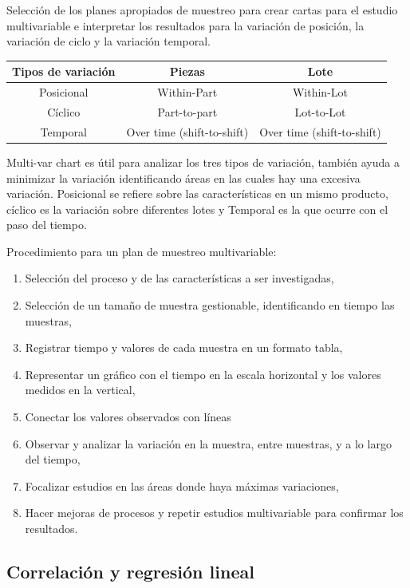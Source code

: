 \documentclass[]{article}
\begin{document}
Selección de los planes apropiados de muestreo para crear cartas para el estudio multivariable e interpretar los resultados para la variación de posición, la variación de ciclo y la variación temporal.

\begin{tabular}{|c|c|c|}
	\hline Tipos de variación & Piezas & Lote \\ 
	\hline Posicional & Within-Part & Within-Lot \\ 
	\hline Cíclico & Part-to-part & Lot-to-Lot \\ 
	\hline Temporal & Over time (shift-to-shift) & Over time (shift-to-shift) \\ 
	\hline 
\end{tabular} 

Multi-var chart es útil para analizar los tres tipos de variación, también ayuda a minimizar la variación identificando áreas en las cuales hay una excesiva variación.
Posicional se refiere sobre las características en un mismo producto, cíclico es la variación sobre diferentes lotes y Temporal es la que ocurre con el paso del tiempo.


Procedimiento para un plan de muestreo multivariable:

\begin{enumerate}
	\item Selección del proceso y de las características a ser investigadas,
	\item Selección de un tamaño de muestra gestionable, identificando en tiempo las muestras,
	\item Registrar tiempo y valores de cada muestra en un formato tabla,
	\item Representar un gráfico con el tiempo en la escala horizontal y los valores medidos en la vertical,
	\item Conectar los valores observados con líneas
	\item Observar y analizar la variación en la muestra, entre muestras, y a lo largo del tiempo,
	\item Focalizar estudios en las áreas donde haya máximas variaciones,
	\item Hacer mejoras de procesos y repetir estudios multivariable para confirmar los resultados.
\end{enumerate}

\subsection{Correlación y regresión lineal}
\end{document}
